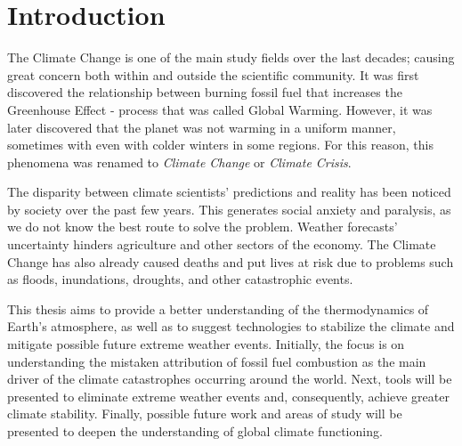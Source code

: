 \chapter*[Introduction]{Introduction}

The Climate Change is one of the main study fields over the last decades; causing great concern both within and outside the scientific community. It was first discovered the relationship between burning fossil fuel that increases the Greenhouse Effect - process that was called Global Warming. However, it was later discovered that the planet was not warming in a uniform manner, sometimes with even with colder winters in some regions. For this reason, this phenomena was renamed to \textit{Climate Change} or \textit{Climate Crisis}.

The disparity between climate scientists' predictions and reality has been noticed by society over the past few years. This generates social anxiety and paralysis, as we do not know the best route to solve the problem. Weather forecasts' uncertainty hinders agriculture and other sectors of the economy. The Climate Change has also already caused deaths and put lives at risk due to problems such as floods, inundations, droughts, and other catastrophic events.

This thesis aims to provide a better understanding of the thermodynamics of Earth's atmosphere, as well as to suggest technologies to stabilize the climate and mitigate possible future extreme weather events. Initially, the focus is on understanding the mistaken attribution of fossil fuel combustion as the main driver of the climate catastrophes occurring around the world. Next, tools will be presented to eliminate extreme weather events and, consequently, achieve greater climate stability. Finally, possible future work and areas of study will be presented to deepen the understanding of global climate functioning.